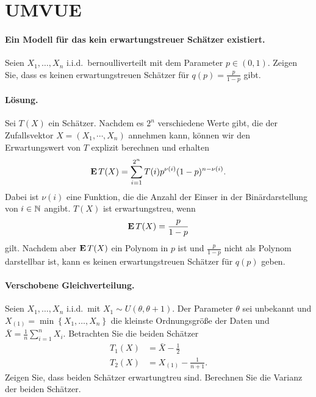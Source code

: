\section{UMVUE}

\paragraph{Ein Modell für das kein erwartungstreuer Schätzer existiert.}
Seien $X_1,\ldots,X_n$ i.i.d.\ bernoulliverteilt mit dem Parameter $p \in
(0,1)$. Zeigen Sie, dass es keinen erwartungstreuen Schätzer für $q(p) =
\frac{p}{1-p}$ gibt. 

\paragraph*{Lösung.} Sei $T(X)$ ein Schätzer. Nachdem es $2^n$ verschiedene
Werte gibt, die der Zufallsvektor $X = (X_1, \cdots, X_n)$ annehmen kann, können 
wir den Erwartungswert von $T$ explizit berechnen und erhalten
\begin{equation*}
    \mathbf{E} \, T(X) = \sum_{i = 1}^{2^n} T(i) p^{\nu(i)}(1-p)^{n - \nu(i)}.
\end{equation*}
Dabei ist $\nu(i)$ eine Funktion, die die Anzahl der Einser in der
Binärdarstellung von $i\in \mathbb N$ angibt. $T(X)$ ist erwartungstreu, wenn 
\begin{equation*}
    \mathbf{E} \, T(X) = \frac{p}{1-p}
\end{equation*}
gilt. Nachdem aber $\mathbf{E}\, T(X)$ ein Polynom in $p$ ist und $\frac{p}{1-p}$ nicht
als Polynom darstellbar ist, kann es keinen erwartungstreuen Schätzer für
$q(p)$ geben. 


\paragraph{Verschobene Gleichverteilung. } 
Seien $X_1,\ldots,X_n$ i.i.d.\ mit $X_1\sim U(\theta,\theta+1)$. Der Parameter
$\theta$ sei  unbekannt und $X_{(1)}=\min\left\{ X_1,\ldots,X_n \right\}$ die
kleinste Ordnungsgröße der Daten und $\bar X= \frac{1}{n}\sum_{i=1}^{n}X_i$.
Betrachten Sie die beiden Schätzer 
\begin{align*}
	T_1(X) &= \bar X - \frac{1}{2} \\
	T_2(X) &=  X_{(1)} - \frac{1}{n+1}.
\end{align*}
Zeigen Sie, dass beiden Schätzer erwartungtreu sind. Berechnen Sie 
die Varianz der beiden Schätzer.

